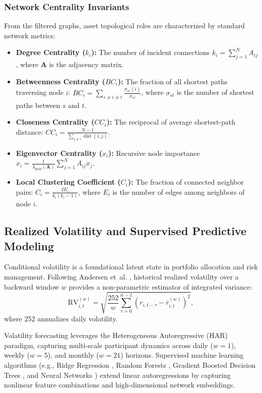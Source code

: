 \subsubsection{Network Centrality Invariants}
From the filtered graphs, asset topological roles are characterized by standard network metrics:
\begin{itemize}
  \item \textbf{Degree Centrality ($k_i$):} The number of incident connections $k_i = \sum_{j=1}^N A_{ij}$, where $\mathbf{A}$ is the adjacency matrix.
  \item \textbf{Betweenness Centrality ($BC_i$):} The fraction of all shortest paths traversing node $i$: $BC_i = \sum_{s \neq i \neq t} \frac{\sigma_{st}(i)}{\sigma_{st}}$, where $\sigma_{st}$ is the number of shortest paths between $s$ and $t$.
  \item \textbf{Closeness Centrality ($CC_i$):} The reciprocal of average shortest-path distance: $CC_i = \frac{N-1}{\sum_{j \neq i} \operatorname{dist}(i, j)}$.
  \item \textbf{Eigenvector Centrality ($x_i$):} Recursive node importance $x_i = \frac{1}{\lambda_{\max}(\mathbf{A})} \sum_{j=1}^N A_{ij} x_j$.
  \item \textbf{Local Clustering Coefficient ($C_i$):} The fraction of connected neighbor pairs: $C_i = \frac{2 E_i}{k_i(k_i - 1)}$, where $E_i$ is the number of edges among neighbors of node $i$.
\end{itemize}

\subsection{Realized Volatility and Supervised Predictive Modeling}
\label{subsec:theory_volatility}

Conditional volatility is a foundational latent state in portfolio allocation and risk management. Following Andersen et~al. \cite{andersen_2003_modeling}, historical realized volatility over a backward window $w$ provides a non-parametric estimator of integrated variance:
\begin{equation}
\mathrm{RV}_{i,t}^{(w)} = \sqrt{\frac{252}{w} \sum_{\tau=0}^{w-1} \left( r_{i,t-\tau} - \overline{r}_{i,t}^{(w)} \right)^2},
\label{eq:theory_rv}
\end{equation}
where 252 annualizes daily volatility.

Volatility forecasting leverages the Heterogeneous Autoregressive (HAR) paradigm, capturing multi-scale participant dynamics across daily ($w=1$), weekly ($w=5$), and monthly ($w=21$) horizons. Supervised machine learning algorithms (e.g., Ridge Regression \cite{hoerl_kennard_1970_ridge}, Random Forests \cite{breiman_2001_random}, Gradient Boosted Decision Trees \cite{friedman_2001_greedy}, and Neural Networks \cite{bucci_2020_realized,christensen_2022_realized}) extend linear autoregressions by capturing nonlinear feature combinations and high-dimensional network embeddings.


